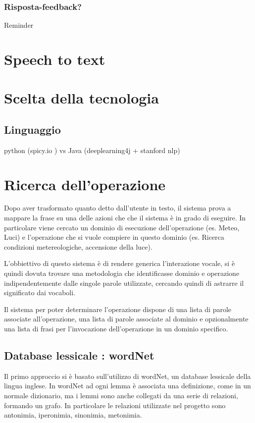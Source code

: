 \documentclass[twoside]{supsistudent}
\begin{document}
\subsection{Risposta-feedback?}
Reminder
\chapter{Speech to text}
\chapter{Scelta della tecnologia}
\section{Linguaggio}
python (spicy.io ) vs Java (deeplearning4j + stanford nlp)
\chapter{Ricerca dell'operazione}
Dopo aver trasformato quanto detto dall'utente in testo, il sistema prova a mappare la frase su una delle azioni che che il sistema è in grado di eseguire.
In particolare viene cercato un dominio di esecuzione dell'operazione (es. Meteo, Luci) e l'operazione che si vuole compiere in questo dominio (es. Ricerca condizioni metereologiche, accensione della luce).


L'obbiettivo di questo sistema è di rendere generica l'interazione vocale, si è quindi dovuta trovare una metodologia che identificasse dominio e operazione indipendentemente dalle singole parole utilizzate, cercando quindi di astrarre il significato dai vocaboli.

 Il sistema per poter determinare l'operazione dispone di una lista di parole associate all'operazione, una lista di parole associate al dominio e opzionalmente una lista di frasi per l'invocazione dell'operazione in un dominio specifico.

\section{Database lessicale : wordNet}
Il primo approccio si è basato sull'utilizzo di wordNet, un database lessicale della lingua inglese.
In wordNet ad ogni lemma è associata una definizione, come in un normale dizionario, ma i lemmi sono anche collegati da una serie di relazioni, formando un grafo. In particolare le relazioni utilizzate nel progetto sono antonimia, iperonimia, sinonimia, metonimia.\cite{wordNet}
\end{document}
